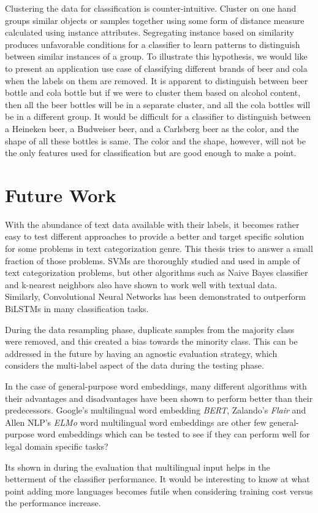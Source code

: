 Clustering the data for classification is counter-intuitive. Cluster on one hand groups similar objects or samples together using some form of distance measure calculated using instance attributes. Segregating instance based on similarity produces unfavorable conditions for a classifier to learn patterns to distinguish between similar instances of a group. To illustrate this hypothesis, we would like to present an application use case of classifying different brands of beer and cola when the labels on them are removed. It is apparent to distinguish between beer bottle and cola bottle but if we were to cluster them based on alcohol content, then all the beer bottles will be in a separate cluster, and all the cola bottles will be in a different group. It would be difficult for a classifier to distinguish between a Heineken beer, a Budweiser beer, and a Carlsberg beer as the color, and the shape of all these bottles is same. The color and the shape, however, will not be the only features used for classification but are good enough to make a point.

\section{Future Work}\label{sec:futureWorks}

With the abundance of text data available with their labels, it becomes rather easy to test different approaches to provide a better and target specific solution for some problems in text categorization genre.  This thesis tries to answer a small fraction of those problems.  \glspl{SVM} are thoroughly studied and used in ample of text categorization problems, but other algorithms such as Naive Bayes classifier and k-nearest neighbors also have shown to work well with textual data. Similarly,  Convolutional Neural Networks has been demonstrated to outperform \glspl{BiLSTM} in many classification tasks.

During the data resampling phase, duplicate samples from the majority class were removed, and this created a bias towards the minority class. This can be addressed in the future by having an agnostic evaluation strategy, which considers the multi-label aspect of the data during the testing phase. 

In the case of general-purpose word embeddings, many different algorithms with their advantages and disadvantages have been shown to perform better than their predecessors. Google's multilingual word embedding \textit{BERT}, Zalando's \textit{Flair} and Allen NLP's \textit{ELMo} word multilingual word embeddings are other few general-purpose word embeddings which can be tested to see if they can perform well for legal domain specific tasks?

Its shown in during the evaluation that multilingual input helps in the betterment of the classifier performance. It would be interesting to know at what point adding more languages becomes futile when considering training cost versus the performance increase.



